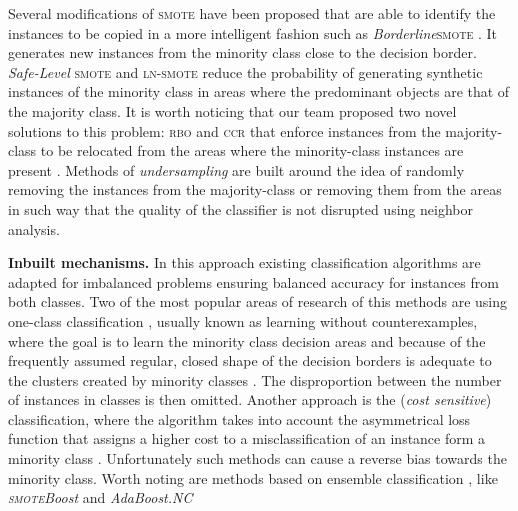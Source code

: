 \documentclass[pmlr]{jmlr}
\begin{document}
Several modifications of \textsc{smote} have been proposed that are able to identify the instances to be copied in a more intelligent fashion such as \emph{Borderline}\textsc{smote} \cite{Han:2005}. It generates new instances from the minority class close to the decision border. \emph{Safe-Level} \textsc{smote} \citep{Bunkhumpornpat:2009} and \textsc{ln}-\textsc{smote} \cite{Maciejewski:2011} reduce the probability of generating synthetic instances of the minority class in areas where the predominant objects are that of the majority class. It is worth noticing that our team proposed two novel solutions to this problem: \textsc{rbo} \cite{koziarski2017radial} and \textsc{ccr} that enforce instances from the majority-class to be relocated from the areas where the minority-class instances are present \cite{Koziarski:2017amcs}. Methods of \emph{undersampling} are built around the idea of randomly removing the instances from the majority-class or removing them from the areas in such way that the  quality of the classifier is not disrupted using neighbor analysis.%


\noindent\textbf{ Inbuilt mechanisms.} In this approach existing classification algorithms are adapted for imbalanced problems ensuring balanced accuracy for instances from both classes. Two of the most popular areas of research of this methods are using one-class classification  \cite{Japkowicz:1995}, usually known as learning without counterexamples, where the goal is to learn the minority class decision areas and because of the frequently assumed regular, closed shape of the decision borders is adequate to the clusters created by minority classes \cite{Krawczyk:2014ins}. The disproportion between the number of instances in classes is then omitted. Another approach is the (\textit{cost sensitive}) classification, where the algorithm takes into account the asymmetrical loss function that assigns a higher cost to a misclassification of an instance form a minority class \cite{Krawczyk:2014,Lopez:2012,He:2009,Zhou:2006}. Unfortunately such methods can cause a reverse bias towards the minority class. 
Worth noting are methods based on ensemble classification \cite{Wozniak:2014}, like \emph{\textsc{smote}Boost} \cite{Chawla:2003} and \emph{AdaBoost.NC} \cite{Wang:2010}%
\end{document}
